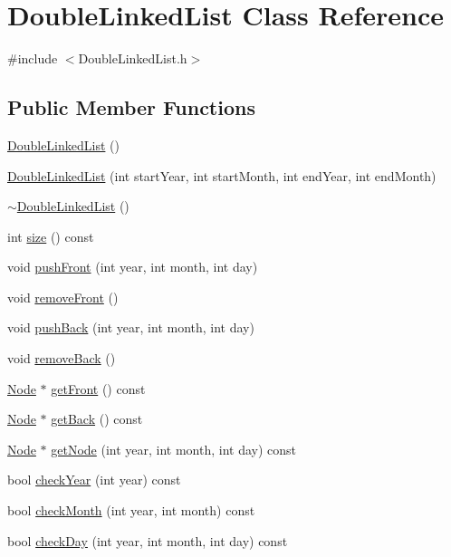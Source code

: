 \hypertarget{classDoubleLinkedList}{\section{Double\-Linked\-List Class Reference}
\label{classDoubleLinkedList}
}


{\ttfamily \#include $<$Double\-Linked\-List.\-h$>$}

\subsection*{Public Member Functions}
\begin{DoxyCompactItemize}
\item 
\hyperlink{classDoubleLinkedList_a7e2c72978120a51da2251e378ef1892c}{Double\-Linked\-List} ()
\item 
\hyperlink{classDoubleLinkedList_aca14acc73e64f2cf121f1a9f06f37693}{Double\-Linked\-List} (int start\-Year, int start\-Month, int end\-Year, int end\-Month)
\item 
\hyperlink{classDoubleLinkedList_ab808039dac47f1f62d00fcf0951550c5}{$\sim$\-Double\-Linked\-List} ()
\item 
int \hyperlink{classDoubleLinkedList_aa5a9a72733c34832f237cca418ec525a}{size} () const 
\item 
void \hyperlink{classDoubleLinkedList_ae4d516bcfeea73b92b9cb927c3a157c7}{push\-Front} (int year, int month, int day)
\item 
void \hyperlink{classDoubleLinkedList_a436c04186fe23d797cae9f89eb1ae579}{remove\-Front} ()
\item 
void \hyperlink{classDoubleLinkedList_a9f5ff04eb32e7fa3e37734754a98df80}{push\-Back} (int year, int month, int day)
\item 
void \hyperlink{classDoubleLinkedList_aa142f7151ffc4f93aa7e5fb111dbf356}{remove\-Back} ()
\item 
\hyperlink{classNode}{Node} $\ast$ \hyperlink{classDoubleLinkedList_af7a43fcd47e701812ec7282e750d66ca}{get\-Front} () const 
\item 
\hyperlink{classNode}{Node} $\ast$ \hyperlink{classDoubleLinkedList_af37a823cffeb12eeb3f00ffe35a5930f}{get\-Back} () const 
\item 
\hyperlink{classNode}{Node} $\ast$ \hyperlink{classDoubleLinkedList_a9d4043921a43ae60db5f44805c8772ab}{get\-Node} (int year, int month, int day) const 
\item 
bool \hyperlink{classDoubleLinkedList_a55b1b4c923c7cb7ed49c131287263b2a}{check\-Year} (int year) const 
\item 
bool \hyperlink{classDoubleLinkedList_a0d87703266d9a88738013e35e4e587e4}{check\-Month} (int year, int month) const 
\item 
bool \hyperlink{classDoubleLinkedList_ae1c0896583217d3a8d423711dabbb375}{check\-Day} (int year, int month, int day) const 
\end{DoxyCompactItemize}



